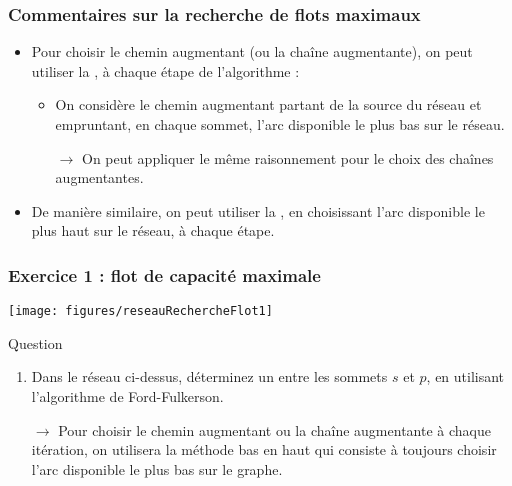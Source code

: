 \documentclass[french,10pt,t,handout]{beamer}
\begin{document}
\begin{frame}
	\frametitle{Commentaires sur la recherche de flots maximaux}
	
	\begin{itemize}
	  \item Pour choisir le chemin augmentant (ou la cha\^ine augmentante), on peut utiliser la
	  		, \`a chaque \'etape de
	  		l'algorithme :
	  		\begin{itemize}
	  		  \item On consid\`ere le chemin augmentant partant de la source du
	  		  r\'eseau et empruntant, en chaque sommet, l'arc disponible le plus bas
	  		  sur le r\'eseau.
	  		  \item[$\rightarrow$] On peut appliquer le m\^eme raisonnement pour le
	  		  choix des cha\^ines augmentantes.
	  		\end{itemize}
	  \item[]		
	  \item De mani\`ere similaire, on peut utiliser la , en choisissant l'arc disponible le plus haut sur le
	  		r\'eseau, \`a chaque \'etape.
	\end{itemize}
\end{frame}


\begin{frame}
	\frametitle{Exercice 1 : flot de capacit\'e maximale}
	\vspace{-0.5cm}
	
	\begin{center}
   		\texttt{[image: figures/reseauRechercheFlot1]} 
	\end{center}
	\vspace{-0.5cm}
	
	\begin{exampleblock}{Question}
		\begin{enumerate}
			\item Dans le r\'eseau ci-dessus, d\'eterminez un  entre les sommets $s$ et $p$, en utilisant
				  l'algorithme de Ford-Fulkerson.
			\item[$\rightarrow$] Pour choisir le chemin augmentant ou la cha\^ine
								 augmentante \`a chaque it\'eration, on utilisera la m\'ethode \og{}bas
								 en haut\fg{} qui consiste \`a toujours choisir l'arc disponible le plus
								 bas sur le graphe.
		\end{enumerate}
	\end{exampleblock}

\end{frame}
\end{document}
